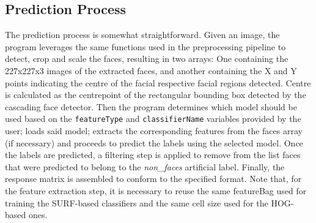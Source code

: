 \documentclass[11pt]{article}
\begin{document}
    \subsection{Prediction Process}
        The prediction process is somewhat straightforward. Given an image, the program leverages the same functions used in the preprocessing pipeline to detect, crop and scale the faces, resulting in two arrays: One containing the 227x227x3 images of the extracted faces, and another containing the X and Y points indicating the centre of the facial respective facial regions detected. Centre is calculated as the centrepoint of the rectangular bounding box detected by the cascading face detector.
        Then the program determines which model should be used based on the \texttt{featureType} and \texttt{classifierName} variables provided by the user; loads said model; extracts the corresponding features from the faces array (if necessary) and proceeds to predict the labels using the selected model. Once the labels are predicted, a filtering step is applied to remove from the list faces that were predicted to belong to the \textit{non\_faces} artificial label. Finally, the response matrix is assembled to conform to the specified format. Note that, for the feature extraction step, it is necessary to reuse the same featureBag used for training the SURF-based classifiers and the same cell size used for the HOG-based ones.
\end{document}
